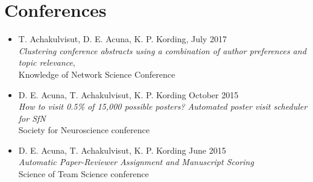 \section{\sc Conferences}

\begin{itemize}[leftmargin=0cm, label={}]

\item T. Achakulvisut, D. E. Acuna, K. P. Kording, \hfill July 2017\\ {\em Clustering conference abstracts using a combination of author preferences and topic relevance}, \\Knowledge of Network Science Conference

\item D. E. Acuna, T. Achakulvisut, K. P. Kording \hfill October 2015\\
{\em How to visit 0.5\% of 15,000 possible posters? Automated poster visit scheduler for SfN}\\ Society for Neuroscience conference

\item D. E. Acuna, T. Achakulvisut, K. P. Kording \hfill June 2015\\
{\em Automatic Paper-Reviewer Assignment and Manuscript Scoring}\\
Science of Team Science conference

\end{itemize}